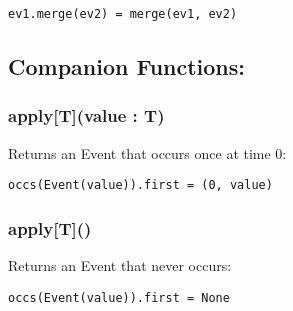 \begin{verbatim}
ev1.merge(ev2) = merge(ev1, ev2)
\end{verbatim}   

 \subsection*{Companion Functions:}
  \subsubsection*{apply[T](value : T)}
    Returns an Event that occurs once at time 0:
  
\begin{verbatim}
occs(Event(value)).first = (0, value) 
\end{verbatim} 

  \subsubsection*{apply[T]()}
    Returns an Event that never occurs:

\begin{verbatim}
occs(Event(value)).first = None
\end{verbatim}    